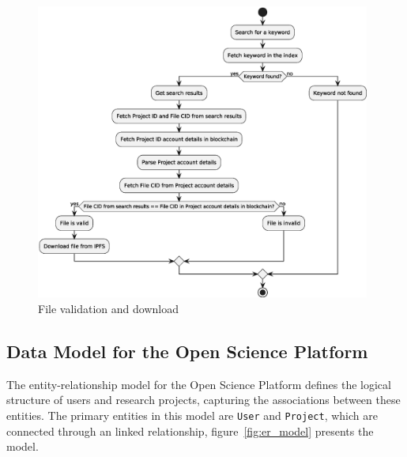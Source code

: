 \documentclass[final]{rc-book-2.14}
\begin{document}
\begin{figure}[htbp]
    \centering
    \includegraphics[width=0.98\textwidth, keepaspectratio]{fig/keyword_and_file_validation.eps}
    \caption{File validation and download}
    \label{fig:c4_file_validation}
\end{figure}



\subsection{Data Model for the Open Science Platform}

The entity-relationship model for the Open Science Platform defines the logical structure of users and research projects, capturing the associations between these entities. The primary entities in this model are \texttt{User} and \texttt{Project}, which are connected through an linked relationship, figure~\ref{fig:er_model} presents the model.
\end{document}

